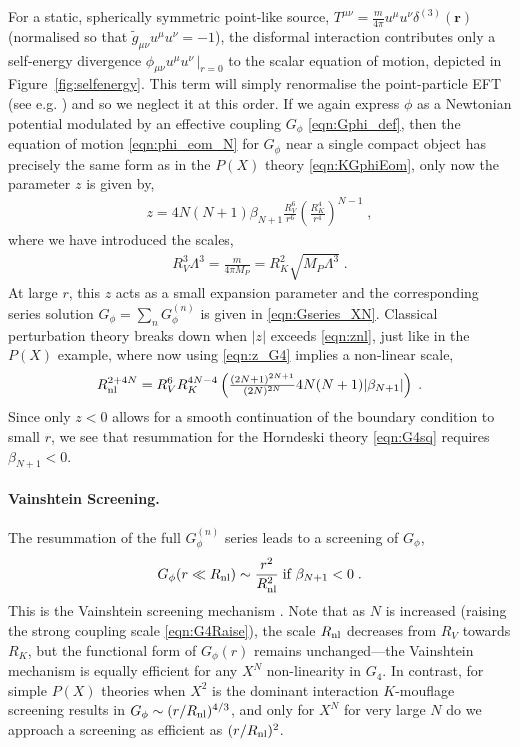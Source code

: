 \documentclass[11pt]{article}
\begin{document}
For a static, spherically symmetric point-like source, $T^{\mu\nu} = \frac{m}{4 \pi} u^{\mu} u^{\nu} \delta^{(3)} (\mathbf{r})$ (normalised so that $\tilde{g}_{\mu\nu}  u^{\mu} u^{\nu} = -1$), the disformal interaction contributes only a self-energy divergence $\phi_{\mu\nu} u^\mu u^\nu \, |_{r=0}$ to the scalar equation of motion, depicted in Figure~\ref{fig:selfenergy}. This term will simply renormalise the point-particle EFT (see e.g. \cite{Kuntz:2019zef}) and so we neglect it at this order. 
If we again express $\phi$ as a Newtonian potential modulated by an effective coupling $G_\phi$ \eqref{eqn:Gphi_def}, then the equation of motion \eqref{eqn:phi_eom_N} for $G_\phi$ near a single compact object has precisely the same form as in the $P(X)$ theory \eqref{eqn:KGphiEom}, only now the parameter $z$ is given by,
\begin{align}
 z =  4 N (N+1) \beta_{N+1} \frac{R_V^6}{r^{6}} \left(  \frac{R_K^4}{r^4}   \right)^{N-1} \; , 
 \label{eqn:z_G4}
\end{align}
where we have introduced the scales,
\begin{align}
 R_V^3 \Lambda^3 = \frac{m}{4 \pi M_P} = R_K^2 \sqrt{ M_P \Lambda^3 } \; . 
\end{align}
At large $r$, this $z$ acts as a small expansion parameter and the corresponding series solution $G_\phi = \sum_{n} G_\phi^{(n)}$ is given in \eqref{eqn:Gseries_XN}.
Classical perturbation theory breaks down when $|z|$ exceeds \eqref{eqn:znl}, just like in the $P(X)$ example, where now using \eqref{eqn:z_G4} implies a non-linear scale, 
\begin{align}
 R_{\rm nl}^{2+4N} =   R_V^6 R_K^{4N-4} \left(  \tfrac{  (2N+1)^{2N+1} }{ (2N)^{2N} }  4 N (N+1) | \beta_{N+1} |  \right) \; .
\end{align}
Since only $z < 0$ allows for a smooth continuation of the boundary condition to small $r$, we see that resummation for the Horndeski theory \eqref{eqn:G4sq} requires $\beta_{N+1} < 0$. 


\paragraph{Vainshtein Screening.}
The resummation of the full $G_\phi^{(n)}$ series leads to a screening of $G_\phi$, 
\begin{align}
G_{\phi} (r \ll R_{\rm nl} ) \sim  \frac{r^2}{R_{\rm nl}^2 }  \; \text{if } \beta_{N+1} < 0 \; . 
\end{align}
This is the Vainshtein screening mechanism \cite{Vainshtein:1972sx, Koyama:2013paa}. 
Note that as $N$ is increased  (raising the strong coupling scale \eqref{eqn:G4Raise}), the scale $R_{\rm nl}$ decreases from $R_V$ towards $R_K$, but the functional form of $G_{\phi} (r)$ remains unchanged---the Vainshtein mechanism is equally efficient for any $X^N$ non-linearity in $G_4$. 
In contrast, for simple $P(X)$ theories when $X^2$ is the dominant interaction $K$-mouflage screening results in $G_\phi \sim (r/R_{\rm nl})^{4/3}$, and only for $X^N$ for very large $N$ do we approach  a screening as efficient as $(r/R_{\rm nl})^2$.  
\end{document}
